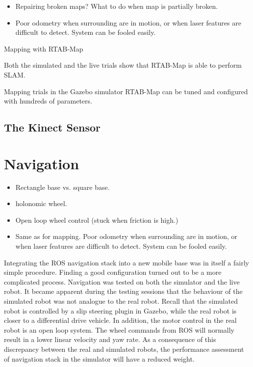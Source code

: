 \begin{itemize}
\item Repairing broken maps? What to do when map is partially broken.
\item Poor odometry when surrounding are in motion, or when laser features are difficult to detect. System can be fooled easily. 
\end{itemize}

Mapping with \ac{RTAB-Map} 

Both the simulated and the live trials show that \ac{RTAB-Map} is able to perform \ac{SLAM}. 

Mapping trials in the Gazebo simulator
\ac{RTAB-Map} can be tuned and configured with hundreds of parameters.

\subsection{The Kinect Sensor}



\section{Navigation}
\begin{itemize}
\item Rectangle base vs. square base.
\item holonomic wheel.
\item Open loop wheel control (stuck when friction is high.)
\item Same as for mapping. Poor odometry when surrounding are in motion, or when laser features are difficult to detect. System can be fooled easily. 
\end{itemize}

Integrating the \ac{ROS} navigation stack into a new mobile base was in itself a fairly simple procedure. Finding a good configuration turned out to be a more complicated process. Navigation was tested on both the simulator and the live robot. It became apparent during the testing sessions that the behaviour of the simulated robot was not analogue to the real robot. Recall that the simulated robot is controlled by a slip steering plugin in Gazebo, while the real robot is closer to a differential drive vehicle. In addition, the motor control in the real robot is an open loop system. The wheel commands from \ac{ROS} will normally result in a lower linear velocity and yaw rate. As a consequence of this discrepancy between the real and simulated robots, the performance assessment of navigation stack in the simulator will have a reduced weight.

